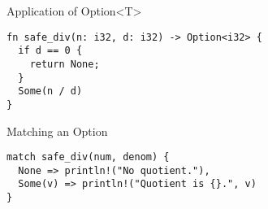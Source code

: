 
\begin{frame}[fragile]{Application of Option<T>}
\begin{verbatim}
fn safe_div(n: i32, d: i32) -> Option<i32> {
  if d == 0 {
    return None;
  }
  Some(n / d)
}
\end{verbatim}
\end{frame}


\begin{frame}[fragile]{Matching an Option}
\begin{verbatim}
match safe_div(num, denom) {
  None => println!("No quotient."),
  Some(v) => println!("Quotient is {}.", v)
}
\end{verbatim}
\end{frame}


